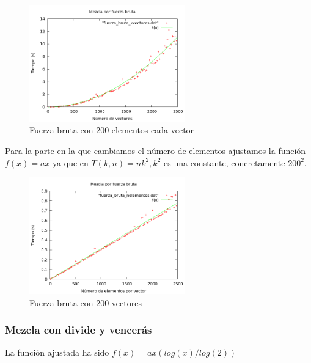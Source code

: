 \begin{figure}[htb] 
\centering
	\includegraphics[width=0.6\textwidth]{../Obligatorio/Graficas/fuerza_bruta_kvectores.png}
	\caption{Fuerza bruta con 200 elementos cada vector} 
	\label{fig:f_kvectores} 
\end{figure}

\newpage
Para la parte en la que cambiamos el n\'umero de elementos ajustamos la funci\'on 
$f(x) = ax$ ya 	que en $T(k, n) = nk^2, k^2$ es una constante, concretamente $200^2$.

\begin{center}
\end{center}


\begin{figure}[htb] 
\centering
	\includegraphics[width=0.6\textwidth]{../Obligatorio/Graficas/fuerza_bruta_nelementos.png}
	\caption{Fuerza bruta con 200 vectores} 
	\label{fig:f_nelementos} 
\end{figure}
\newpage


\subsubsection{Mezcla con divide y vencer\'as}
La funci\'on ajustada ha sido $f(x) = ax(log(x)/log(2))$

